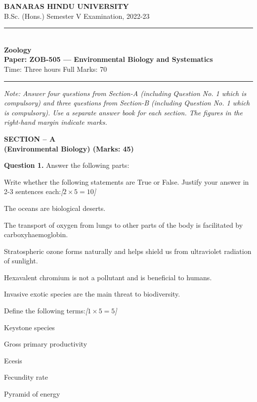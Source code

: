 \documentclass[11pt,a4paper]{article}
\newcommand{\pts}[1]{\hfill   \textit{[#1]}}
\begin{document}
\begin{center}
  {\large\bfseries BANARAS HINDU UNIVERSITY}\\[2pt]
  {\normalsize B.Sc. (Hons.) Semester V Examination, 2022-23}\\[6pt]
  \rule{0.8\linewidth}{0.5pt}\\[6pt]
  {\large\bfseries Zoology}\\[4pt]
  {\large\bfseries Paper: ZOB-505 --- Environmental Biology and Systematics}\\[4pt]
  {\normalsize Time: Three hours \hfill Full Marks: 70}
\end{center}

\rule{\linewidth}{0.4pt}

\smallskip



\noindent   \textit{Note: Answer four questions from Section-A (including Question No. 1 which is compulsory) and three questions from Section-B (including Question No. 1 which is compulsory). Use a separate answer book for each section. The figures in the right-hand margin indicate marks.}

\bigskip

\begin{center}
   \textbf{SECTION -- A} \\
   \textbf{(Environmental Biology) (Marks: 45)}
\end{center}

\medskip


\noindent   \textbf{Question 1.} Answer the following parts:

\begin{parts}
  \item Write whether the following statements are True or False. Justify your answer in 2-3 sentences each:\pts{$2  \times 5 = 10$}
  
\begin{parts}
    \item The oceans are biological deserts.
    \item The transport of oxygen from lungs to other parts of the body is facilitated by carboxyhaemoglobin.
    \item Stratospheric ozone forms naturally and helps shield us from ultraviolet radiation of sunlight.
    \item Hexavalent chromium is not a pollutant and is beneficial to humans.
    \item Invasive exotic species are the main threat to biodiversity.
  \end{parts}
  
  \item Define the following terms:\pts{$1  \times 5 = 5$}
  
\begin{parts}
    \item Keystone species
    \item Gross primary productivity
    \item Ecesis
    \item Fecundity rate
    \item Pyramid of energy
  \end{parts}
\end{parts}
\end{document}
